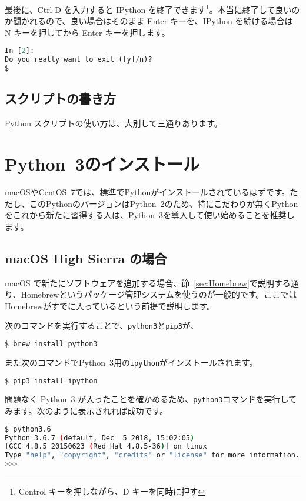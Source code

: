 最後に、Ctrl-D を入力すると IPython を終了できます\footnote{Control キーを押しながら、D キーを同時に押す}。本当に終了して良いのか聞かれるので、良い場合はそのまま Enter キーを、IPython を続ける場合は N キーを押してから Enter キーを押します。

\begin{lstlisting}[language=python]
In [2]:
Do you really want to exit ([y]/n)? 
$ 
\end{lstlisting}

\subsection{スクリプトの書き方}

Python スクリプトの使い方は、大別して三通りあります。

\section{Python~3のインストール}
\label{sec:Python_Install}

macOSやCentOS~7では、標準でPythonがインストールされているはずです。ただし、このPythonのバージョンはPython~2のため、特にこだわりが無くPythonをこれから新たに習得する人は、Python~3を導入して使い始めることを推奨します。

\subsection{macOS High Sierra の場合}

macOS で新たにソフトウェアを追加する場合、節~\ref{sec:Homebrew}で説明する通り、Homebrewというパッケージ管理システムを使うのが一般的です。ここではHomebrewがすでに入っているという前提で説明します。

次のコマンドを実行することで、\texttt{python3}と\texttt{pip3}が、
\begin{lstlisting}[language=bash]
$ brew install python3
\end{lstlisting}
また次のコマンドでPython~3用の\texttt{ipython}がインストールされます。
\begin{lstlisting}[language=bash]
$ pip3 install ipython
\end{lstlisting}

問題なく Python~3 が入ったことを確かめるため、\texttt{python3}コマンドを実行してみます。次のように表示されれば成功です。
\begin{lstlisting}[language=bash]
$ python3.6
Python 3.6.7 (default, Dec  5 2018, 15:02:05) 
[GCC 4.8.5 20150623 (Red Hat 4.8.5-36)] on linux
Type "help", "copyright", "credits" or "license" for more information.
>>> 
\end{lstlisting}

